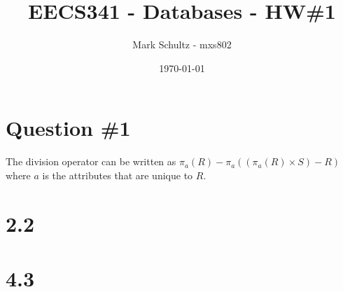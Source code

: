 \documentclass[11pt]{article}
\begin{document}
\title{EECS341 - Databases - HW\#1}
\date{\today}
\author{Mark Schultz - mxs802}
\maketitle
\vspace{.5in}
\section*{Question \#1}
The division operator can be written as $\pi_a(R)-\pi_a((\pi_a(R)\times S)-R)$ where $a$ is the attributes that are unique to $R$.
\section*{2.2}
\vspace{2in}
\section*{4.3}
\end{document}
